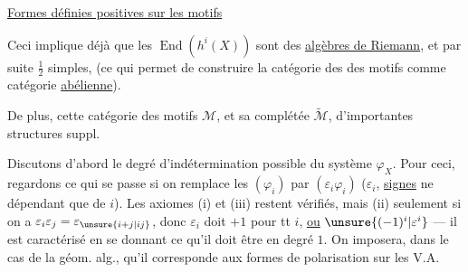 \uline{Formes définies positives sur les motifs}

Ceci implique déjà que les $\operatorname{End}(h^i(X))$ sont des \uline{algèbres de Riemann}, et par suite $\frac12$ simples, (ce qui permet de construire la catégorie des des motifs comme catégorie \uline{abélienne}).

De plus, cette catégorie des motifs $\mathcal M$, et sa complétée $\widetilde{\mathcal M}$,  d'importantes structures suppl.

Discutons d'abord le degré d'indétermination possible du système $\varphi_X$. Pour ceci,   regardons ce qui se passe si on remplace les $(\varphi_i)$ par $(\varepsilon_i\varphi_i)$ ($\varepsilon_i$, \uline{signes} ne dépendant que de $i$). Les axiomes (i) et (iii) restent vérifiés, mais (ii) seulement si on a $\varepsilon_i\varepsilon_j=\varepsilon_{\unsure{i+j|ij}}$, donc $\varepsilon_i$ doit  $+1$ pour tt $i$, \uline{ou} $\unsure{(-1)^i|\varepsilon^i}$ --- il est caractérisé en se donnant ce qu'il doit être en degré $1$.
On imposera, dans le cas de la géom. alg., qu'il corresponde aux formes de polarisation sur les V.A.
